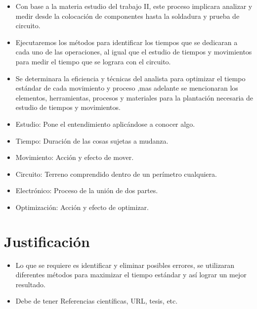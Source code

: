 \begin{itemize}
    \item Con base a la materia estudio del trabajo II,   este proceso implicara analizar y medir desde la colocación de componentes hasta la soldadura y prueba de circuito.  
    \item Ejecutaremos los  métodos para  identificar los tiempos que se dedicaran a cada uno de las operaciones, al igual que el estudio de tiempos y movimientos para medir el tiempo que se lograra con el circuito. 
    \item Se determinara la 
 eficiencia y técnicas del analista para optimizar el tiempo estándar de cada movimiento y proceso ,mas adelante se mencionaran los elementos, herramientas,  procesos y materiales para la plantación necesaria de estudio de tiempos y movimientos.
 
\item Estudio: Pone el entendimiento aplicándose a conocer algo.
\item Tiempo: Duración de las cosas sujetas a mudanza.
\item Movimiento: Acción y efecto de mover.
\item Circuito: Terreno comprendido dentro de un perímetro cualquiera.
\item Electrónico: Proceso de la unión de dos partes.
\item Optimización: Acción y efecto de optimizar.
\end{itemize}
% 
% 
\section{Justificación}

\begin{itemize}
    \item Lo que se requiere es identificar y eliminar posibles errores, se utilizaran diferentes  métodos para maximizar el tiempo estándar y así lograr un mejor resultado.  
    \item Debe de tener Referencias científicas, URL, tesis, etc.
\end{itemize}
% 
% 
